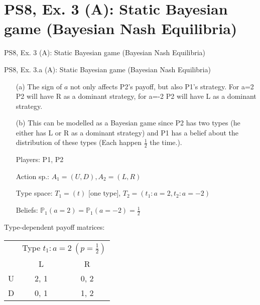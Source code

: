 \section{PS8, Ex. 3 (A): Static Bayesian game (Bayesian Nash Equilibria)}

\begin{frame}{PS8, Ex. 3 (A): Static Bayesian game (Bayesian Nash Equilibria)}
  \begin{multicols}{2}
    \vfill\null\columnbreak
    \vfill\null
  \end{multicols}
\end{frame}

\begin{frame}{PS8, Ex. 3.a (A): Static Bayesian game (Bayesian Nash Equilibria)}
  \begin{multicols}{2}
    \begin{itemize}
    \item[(a)] The sign of $a$ not only affects P2's payoff, but also P1's strategy. For a=2 P2 will have R as a dominant strategy, for a=-2 P2 will have L as a dominant strategy.
    \item[(b)] This can be modelled as a Bayesian game since P2 has two types (he either has L or R as a dominant strategy) and P1 has a belief about the distribution of these types (Each happen $\frac{1}{2}$ the time.). 
        \item[Players:] P1, P2
        \item[Action sp.:] $A_1=(U,D),A_2=(L,R)$
        \item[Type space:] $T_1=(t)$ [one type], $T_2=(t_1:a=2,t_2:a=-2)$
        \item[Beliefs:] $\mathbb{P}_1(a=2)=\mathbb{P}_1(a=-2)=\frac{1}{2}$
        \vfill\null\columnbreak
    \end{itemize}
    Type-dependent payoff matrices:
    \vspace{-8pt}
    \begin{table}
        \begin{tabular}{l|c|c|}
        \multicolumn{1}{c}{} & \multicolumn{2}{c}{Type $t_1:a=2\ (p=\frac{1}{2})$} \\
        \multicolumn{1}{c}{} & \multicolumn{1}{c}{L} & \multicolumn{1}{c}{R} \\\cline{2-3}
        U & 2, 1 & 0, 2 \\\cline{2-3}
        D & 0, 1 & 1, 2 \\\cline{2-3}
      \end{tabular}
    \end{table}

\end{multicols}
\end{frame}
